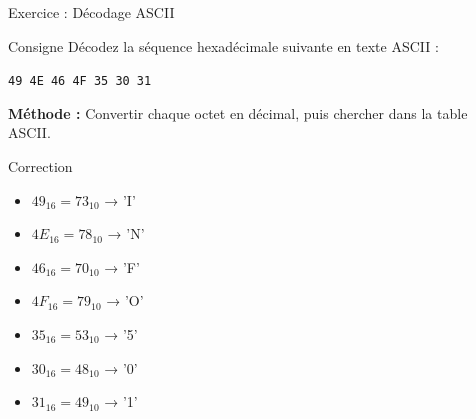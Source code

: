 \documentclass[aspectratio=1610]{beamer}
\begin{document}
\begin{frame}{Exercice : Décodage ASCII}

  \begin{exampleblock}{Consigne}
    Décodez la séquence hexadécimale suivante en texte ASCII :

    \begin{center}
      \texttt{49 4E 46 4F 35 30 31}
    \end{center}
  \end{exampleblock}


  \textbf{Méthode :} Convertir chaque octet en décimal, puis chercher dans la table ASCII.


  \pause

  \begin{block}{Correction}
    \small
    \begin{itemize}
      \setlength\itemsep{0em}
      \item $49_{16} = 73_{10}$ → 'I'
      \item $4E_{16} = 78_{10}$ → 'N'
      \item $46_{16} = 70_{10}$ → 'F'
      \item $4F_{16} = 79_{10}$ → 'O'
      \item $35_{16} = 53_{10}$ → '5'
      \item $30_{16} = 48_{10}$ → '0'
      \item $31_{16} = 49_{10}$ → '1'
    \end{itemize}

  \end{block}

\end{frame}
\end{document}
